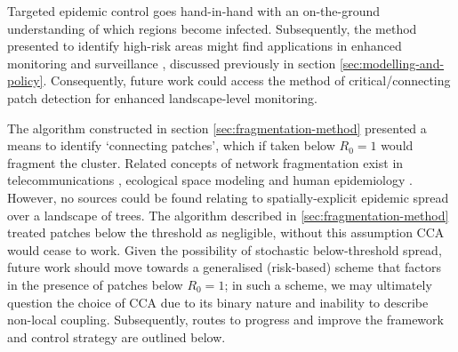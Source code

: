 Targeted epidemic control goes hand-in-hand with an on-the-ground understanding of which regions become infected.
Subsequently, the method presented to identify high-risk areas might find applications in enhanced monitoring and surveillance \cite{surveillance-review}, discussed previously in section \ref{sec:modelling-and-policy}. Consequently, future work could access the method of critical/connecting patch detection for enhanced landscape-level monitoring.

The algorithm constructed in section \ref{sec:fragmentation-method} presented a means to identify `connecting patches', which if taken below $R_0=1$ would fragment the cluster.
Related concepts of network fragmentation exist in telecommunications \cite{albert2000error}, ecological space modeling \cite{luo2021understanding} and human epidemiology \cite{chami2017social}.
However, no sources could be found relating to spatially-explicit epidemic spread over a landscape of trees.
The algorithm described in \ref{sec:fragmentation-method} treated patches below the threshold as negligible, without this assumption CCA would cease to work.
Given the possibility of stochastic below-threshold spread, future work should move towards a generalised (risk-based) scheme that factors in the presence of patches below $R_0=1$;
in such a scheme, we may ultimately question the choice of CCA due to its binary nature and inability to describe non-local coupling. Subsequently, routes to progress and improve the framework and control strategy are outlined below.





